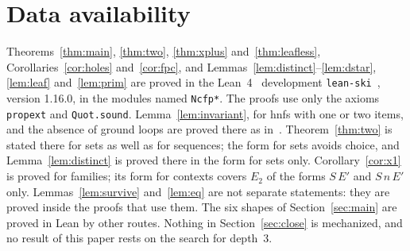 \documentclass[11pt]{amsart}
\begin{document}
\section*{Data availability}
Theorems~\ref{thm:main}, \ref{thm:two}, \ref{thm:xplus} and~\ref{thm:leafless},
Corollaries~\ref{cor:holes} and~\ref{cor:fpc}, and Lemmas~\ref{lem:distinct}--\ref{lem:dstar},
\ref{lem:leaf} and~\ref{lem:prim} are proved in the Lean~4~\citep{lean4} development
\texttt{lean-ski}~\citep{leanski}, version 1.16.0, in the modules named \texttt{Ncfp*}. The
proofs use only the axioms \texttt{propext} and \texttt{Quot.sound}. Lemma~\ref{lem:invariant},
for hnfs with one or two items, and the absence of ground loops are proved there as
in~\citep{s6,s7}. Theorem~\ref{thm:two} is stated there for sets as well as for
sequences; the form for sets avoids choice, and Lemma~\ref{lem:distinct} is proved there in the form for sets only. Corollary~\ref{cor:x1} is proved for families; its
form for contexts covers $E_2$ of the forms $S\,E'$ and $S\,n\,E'$ only.
Lemmas~\ref{lem:survive} and~\ref{lem:eq} are not separate statements: they are proved inside the
proofs that use them. The six shapes of Section~\ref{sec:main} are proved in Lean by other
routes. Nothing in Section~\ref{sec:close} is mechanized, and no result of this paper rests on the
search for depth~$3$.



\end{document}
